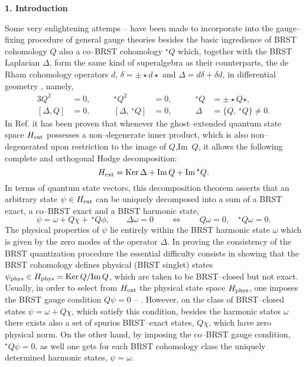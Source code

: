 \documentclass[a4paper,11pt]{article}
\begin{document}
\bigskip\medskip
\begin{flushleft}
{\large{\bf 1. Introduction}}
\end{flushleft}
\bigskip
Some very enlightening attemps \cite{1} -- \cite{8} have been made to 
incorporate into the gauge--fixing procedure of general gauge theories besides 
the basic ingredience of BRST cohomology $Q$ also a co--BRST cohomology 
$^\star Q$ which, together with the BRST Laplacian $\Delta$, form the 
same kind of superalgebra as their counterparts, the de Rham cohomology 
operators $d$, $\delta = \pm \star d \star$ and $\Delta = d \delta + \delta d$, 
in differential geometry \cite{9}, namely,
\begin{alignat*}{3}
Q^2 &= 0, 
&\qquad  
^\star Q^2 &= 0,
&\qquad 
^\star Q &= \pm \star Q \star,
\\
[ \Delta, Q ] &= 0,
&\qquad 
[ \Delta, \,^\star Q ] &= 0,
&\qquad
\Delta &= \{ Q, \,^\star Q \} \neq 0.
\end{alignat*}
In Ref. \cite{8} it has been proven that whenever the ghost--extended 
quantum state space $H_{\rm ext}$ possesses a non--degenerate inner product,
which is also non--degenerated upon restriction to the image of $Q$,Im\, $Q$, it allows the 
following complete and orthogonal Hodge decomposition:
\begin{equation*}  
H_{\rm ext} = {\rm Ker}\, \Delta + {\rm Im}\, Q + {\rm Im} \,^\star Q.
\end{equation*}
In terms of quantum state vectors, this decomposition theorem asserts 
that an arbitrary state $\psi \in H_{\rm ext}$ can be uniquely decomposed 
into a sum of a BRST exact, a co--BRST exact and a BRST harmonic state,
\begin{equation*}
\psi = \omega + Q \chi + \,^\star Q \phi,
\qquad
\Delta \omega = 0
\qquad
\Leftrightarrow
\qquad
Q \omega = 0,
\quad
^\star Q \omega = 0.
\end{equation*}
The physical properties of $\psi$ lie entirely within the 
BRST harmonic state $\omega$ which is given by the zero modes of the
operator $\Delta$. In proving the consistency of the BRST quantization
procedure the essential difficulty consists in showing that the BRST
cohomology defines physical (BRST singlet) states 
$\psi_{\rm phys} \in H_{\rm phys} = {\rm Ker}\, Q/ {\rm Im}\, Q$, which are
taken to be BRST--closed but not exact. Usually, in order to select from 
$H_{\rm ext}$ the physical state space $H_{\rm phys}$, one imposes the 
BRST gauge condition $Q \psi = 0$ \cite{10} -- \cite{12}. However,
on the class of BRST--closed states $\psi = \omega + Q \chi$, which satisfy 
this condition, besides the harmonic states $\omega$ there exists also 
a set of spurios BRST--exact states, $Q \chi$, which have zero physical
norm. On the other hand, by imposing the co--BRST gauge condition, 
$^\star Q \psi = 0$, as well one gets for each BRST cohomology class the 
uniquely determined harmonic states, $\psi = \omega$.
\end{document}
